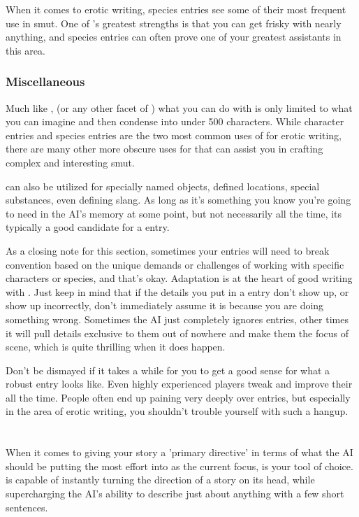 ﻿\documentclass[Coomer-main.tex]{subfiles}
\begin{document}
When it comes to erotic writing, species entries see some of their most frequent use in smut.
One of \aid's greatest strengths is that you can get frisky with nearly anything, and species entries can often prove one of your greatest assistants in this area.

\subsection{Miscellaneous}

Much like \an, (or any other facet of \aid) what you can do with \wi is only limited to what you can imagine and then condense into under 500 characters.
While character entries and species entries are the two most common uses of \wi for erotic writing, there are many other more obscure uses for \wi that can assist you in crafting complex and interesting smut.

\wi can also be utilized for specially named objects, defined locations, special substances, even defining slang.
As long as it's something you know you're going to need in the AI's memory at some point, but not necessarily all the time, its typically a good candidate for a \wi entry.

As a closing note for this section, sometimes your \wi entries will need to break convention based on the unique demands or challenges of working with specific characters or species, and that's okay.
Adaptation is at the heart of good writing with \aid.
Just keep in mind that if the details you put in a \wi entry don't show up, or show up incorrectly, don't immediately assume it is because you are doing something wrong.
Sometimes the AI just completely ignores entries, other times it will pull details exclusive to them out of nowhere and make them the focus of scene, which is quite thrilling when it does happen.

Don't be dismayed if it takes a while for you to get a good sense for what a robust \wi entry looks like.
Even highly experienced players tweak and improve their \wi all the time.
People often end up paining very deeply over \wi entries, but especially in the area of erotic writing, you shouldn't trouble yourself with such a hangup.

\chapter{\ans}
\label{ch:ans}

When it comes to giving your story a 'primary directive' in terms of what the AI should be putting the most effort into as the current focus, \an is your tool of choice. \an is capable of instantly turning the direction of a story on its head, while supercharging the AI's ability to describe just about anything with a few short sentences.
\end{document}
